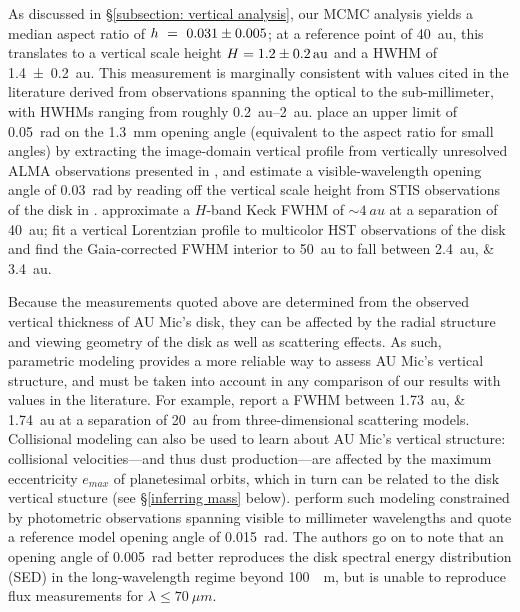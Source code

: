 \documentclass[modern]{aastex62}
\begin{document}
As discussed in \S \ref{subsection: vertical analysis}, our MCMC analysis yields a median aspect ratio of $h~=~\num{0.031 \pm 0.005}$; at a reference point of \SI{40}{au}, this translates to a vertical scale height $H = \SI{1.2 \pm 0.2}{au}$ and a HWHM of \SI{1.4 \pm 0.2}{au}.
This measurement is marginally consistent with values cited in the literature derived from observations spanning the optical to the sub-millimeter, with HWHMs ranging from roughly \SIrange{0.2}{2}{au}.
\citet{schuppler17} place an upper limit of \SI{0.05}{\radian} on the \SI{1.3}{mm} opening angle (equivalent to the aspect ratio for small angles) by extracting the image-domain vertical profile from vertically unresolved ALMA observations presented in \citet{macgregor13}, and estimate a visible-wavelength opening angle of \SI{0.03}{\radian} by reading off the vertical scale height from STIS observations of the disk in \citet{schneider14}.
\citet{metchev05} approximate a $H$-band Keck FWHM of $\sim \SI{4}{au}$ at a separation of \SI{40}{au};
\citet{krist05} fit a vertical Lorentzian profile to multicolor HST observations of the disk and find the Gaia-corrected FWHM interior to \SI{50}{au} to fall between \SIlist{2.4;3.4}{au}.

Because the measurements quoted above are determined from the observed vertical thickness of AU Mic's disk, they can be affected by the radial structure and viewing geometry of the disk as well as scattering effects. 
As such, parametric modeling provides a more reliable way to assess AU Mic’s vertical structure, and must be taken into account in any comparison of our results with values in the literature.  
For example, \citet{krist05} report a FWHM between \SIlist{1.73;1.74}{au} at a separation of \SI{20}{au} from three-dimensional scattering models.
Collisional modeling can also be used to learn about AU Mic's vertical structure: collisional velocities---and thus dust production---are affected by the maximum eccentricity $e_{max}$ of planetesimal orbits, which in turn can be related to the disk vertical stucture (see \S \ref{inferring mass} below). 
\citet{schuppler17} perform such modeling constrained by photometric observations spanning visible to millimeter wavelengths and quote a reference model opening angle of \SI{0.015}{rad}.
The authors go on to note that an opening angle of \SI{0.005}{rad} better reproduces the disk spectral energy distribution (SED) in the long-wavelength regime beyond \SI{100}{\mu m}, but is unable to reproduce flux measurements for $\lambda \leq \SI{70}{\mu m}$.
\end{document}
